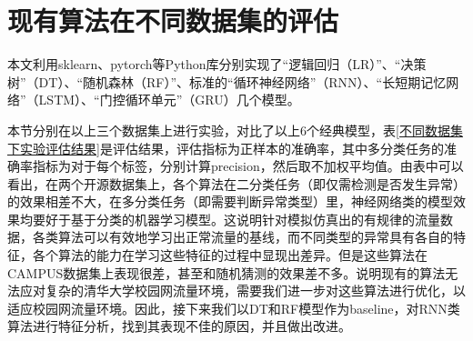 




\section{现有算法在不同数据集的评估}
本文利用sklearn、pytorch等Python库分别实现了“逻辑回归（LR）”、“决策树”（DT）、“随机森林（RF）”、标准的“循环神经网络”（RNN）、“长短期记忆网络”（LSTM）、“门控循环单元”（GRU）几个模型。

本节分别在以上三个数据集上进行实验，对比了以上6个经典模型，表\ref{不同数据集下实验评估结果}是评估结果，评估指标为正样本的准确率，其中多分类任务的准确率指标为对于每个标签，分别计算precision，然后取不加权平均值。由表中可以看出，在两个开源数据集上，各个算法在二分类任务（即仅需检测是否发生异常）的效果相差不大，在多分类任务（即需要判断异常类型）里，神经网络类的模型效果均要好于基于分类的机器学习模型。这说明针对模拟仿真出的有规律的流量数据，各类算法可以有效地学习出正常流量的基线，而不同类型的异常具有各自的特征，各个算法的能力在学习这些特征的过程中显现出差异。但是这些算法在CAMPUS数据集上表现很差，甚至和随机猜测的效果差不多。说明现有的算法无法应对复杂的清华大学校园网流量环境，需要我们进一步对这些算法进行优化，以适应校园网流量环境。因此，接下来我们以DT和RF模型作为baseline，对RNN类算法进行特征分析，找到其表现不佳的原因，并且做出改进。




